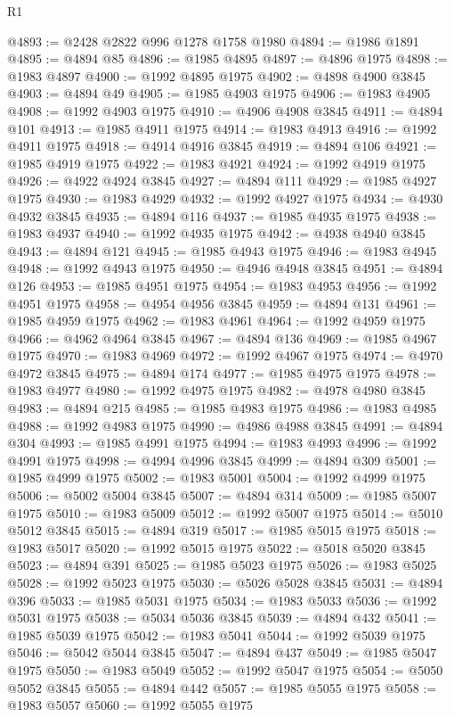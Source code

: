 \begin{lexlean}{R1}
\begin{coremodule}
@4893 := @2428 @2822 @996 @1278 @1758 @1980
@4894 := @1986 @1891
@4895 := @4894 @85
@4896 := @1985 @4895
@4897 := @4896 @1975
@4898 := @1983 @4897
@4900 := @1992 @4895 @1975
@4902 := @4898 @4900 @3845
@4903 := @4894 @49
@4905 := @1985 @4903 @1975
@4906 := @1983 @4905
@4908 := @1992 @4903 @1975
@4910 := @4906 @4908 @3845
@4911 := @4894 @101
@4913 := @1985 @4911 @1975
@4914 := @1983 @4913
@4916 := @1992 @4911 @1975
@4918 := @4914 @4916 @3845
@4919 := @4894 @106
@4921 := @1985 @4919 @1975
@4922 := @1983 @4921
@4924 := @1992 @4919 @1975
@4926 := @4922 @4924 @3845
@4927 := @4894 @111
@4929 := @1985 @4927 @1975
@4930 := @1983 @4929
@4932 := @1992 @4927 @1975
@4934 := @4930 @4932 @3845
@4935 := @4894 @116
@4937 := @1985 @4935 @1975
@4938 := @1983 @4937
@4940 := @1992 @4935 @1975
@4942 := @4938 @4940 @3845
@4943 := @4894 @121
@4945 := @1985 @4943 @1975
@4946 := @1983 @4945
@4948 := @1992 @4943 @1975
@4950 := @4946 @4948 @3845
@4951 := @4894 @126
@4953 := @1985 @4951 @1975
@4954 := @1983 @4953
@4956 := @1992 @4951 @1975
@4958 := @4954 @4956 @3845
@4959 := @4894 @131
@4961 := @1985 @4959 @1975
@4962 := @1983 @4961
@4964 := @1992 @4959 @1975
@4966 := @4962 @4964 @3845
@4967 := @4894 @136
@4969 := @1985 @4967 @1975
@4970 := @1983 @4969
@4972 := @1992 @4967 @1975
@4974 := @4970 @4972 @3845
@4975 := @4894 @174
@4977 := @1985 @4975 @1975
@4978 := @1983 @4977
@4980 := @1992 @4975 @1975
@4982 := @4978 @4980 @3845
@4983 := @4894 @215
@4985 := @1985 @4983 @1975
@4986 := @1983 @4985
@4988 := @1992 @4983 @1975
@4990 := @4986 @4988 @3845
@4991 := @4894 @304
@4993 := @1985 @4991 @1975
@4994 := @1983 @4993
@4996 := @1992 @4991 @1975
@4998 := @4994 @4996 @3845
@4999 := @4894 @309
@5001 := @1985 @4999 @1975
@5002 := @1983 @5001
@5004 := @1992 @4999 @1975
@5006 := @5002 @5004 @3845
@5007 := @4894 @314
@5009 := @1985 @5007 @1975
@5010 := @1983 @5009
@5012 := @1992 @5007 @1975
@5014 := @5010 @5012 @3845
@5015 := @4894 @319
@5017 := @1985 @5015 @1975
@5018 := @1983 @5017
@5020 := @1992 @5015 @1975
@5022 := @5018 @5020 @3845
@5023 := @4894 @391
@5025 := @1985 @5023 @1975
@5026 := @1983 @5025
@5028 := @1992 @5023 @1975
@5030 := @5026 @5028 @3845
@5031 := @4894 @396
@5033 := @1985 @5031 @1975
@5034 := @1983 @5033
@5036 := @1992 @5031 @1975
@5038 := @5034 @5036 @3845
@5039 := @4894 @432
@5041 := @1985 @5039 @1975
@5042 := @1983 @5041
@5044 := @1992 @5039 @1975
@5046 := @5042 @5044 @3845
@5047 := @4894 @437
@5049 := @1985 @5047 @1975
@5050 := @1983 @5049
@5052 := @1992 @5047 @1975
@5054 := @5050 @5052 @3845
@5055 := @4894 @442
@5057 := @1985 @5055 @1975
@5058 := @1983 @5057
@5060 := @1992 @5055 @1975

\end{coremodule}
\end{lexlean}

